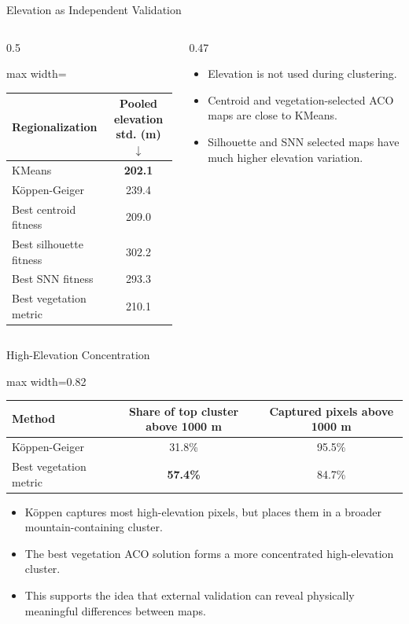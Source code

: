 \documentclass[aspectratio=169,10pt]{beamer}
\newcommand{\betterdown}{\(\downarrow\)}
\begin{document}
\begin{frame}{Elevation as Independent Validation}
  \begin{columns}[T]
    \begin{column}{0.5\textwidth}
      \begin{adjustbox}{max width=\textwidth}
      \begin{tabular}{lc}
        \toprule
        Regionalization & Pooled elevation std. (m) \betterdown \\
        \midrule
        KMeans & \textbf{202.1} \\
        K\"oppen-Geiger & 239.4 \\
        Best centroid fitness & 209.0 \\
        Best silhouette fitness & 302.2 \\
        Best SNN fitness & 293.3 \\
        Best vegetation metric & 210.1 \\
        \bottomrule
      \end{tabular}
      \end{adjustbox}
    \end{column}
    \begin{column}{0.47\textwidth}
      \begin{itemize}
        \item Elevation is not used during clustering.
        \item Centroid and vegetation-selected ACO maps are close to KMeans.
        \item Silhouette and SNN selected maps have much higher elevation variation.
      \end{itemize}
    \end{column}
  \end{columns}
\end{frame}

\begin{frame}{High-Elevation Concentration}
  \begin{adjustbox}{max width=0.82\textwidth}
  \begin{tabular}{lcc}
    \toprule
    Method & Share of top cluster above 1000 m & Captured pixels above 1000 m \\
    \midrule
    K\"oppen-Geiger & 31.8\% & 95.5\% \\
    Best vegetation metric & \textbf{57.4\%} & 84.7\% \\
    \bottomrule
  \end{tabular}
  \end{adjustbox}

  \vspace{1em}
  \begin{itemize}
    \item K\"oppen captures most high-elevation pixels, but places them in a broader mountain-containing cluster.
    \item The best vegetation ACO solution forms a more concentrated high-elevation cluster.
    \item This supports the idea that external validation can reveal physically meaningful differences between maps.
  \end{itemize}
\end{frame}
\end{document}
